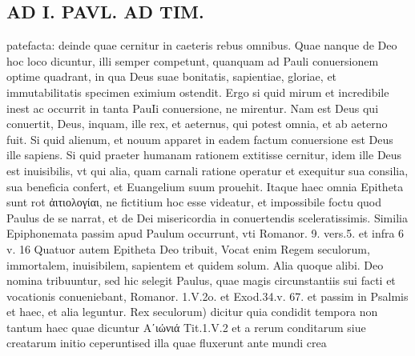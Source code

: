 \documentclass{article}
\begin{document}
\begin{pages}
\section*{AD I. PAVL. AD TIM. }
\marginpar{[ p.30 ]}\pstart patefacta: deinde quae cernitur in caeteris rebus omnibus. Quae nanque de Deo hoc loco dicuntur, illi semper competunt, quanquam ad Pauli conuersionem optime quadrant, in qua Deus suae bonitatis, sapientiae, gloriae, et immutabilitatis specimen eximium ostendit. Ergo si quid mirum et incredibile inest ac occurrit in tanta PauIi conuersione, ne mirentur. Nam est Deus qui conuertit, Deus, inquam, ille rex, et aeternus, qui potest omnia, et ab aeterno fuit. Si quid alienum, et nouum apparet in eadem factum conuersione est Deus ille sapiens. Si quid praeter humanam rationem extitisse cernitur, idem ille Deus est inuisibilis, vt qui alia, quam carnali ratione operatur et exequitur sua consilia, sua beneficia confert, et Euangelium suum prouehit. Itaque haec omnia Epitheta sunt rot ἀιτιολογίαι, ne fictitium hoc esse videatur, et impossibile foctu quod Paulus de se narrat, et de Dei misericordia in conuertendis sceleratissimis. Similia Epiphonemata passim apud Paulum occurrunt, vti Romanor. 9. vers.5. et infra 6 v. 16 Quatuor autem Epitheta Deo tribuit, Vocat enim Regem seculorum, immortalem, inuisibilem, sapientem et quidem solum. Alia quoque alibi. Deo nomina tribuuntur, sed hic selegit Paulus, quae magis circunstantiis sui facti et vocationis conueniebant, Romanor. 1.V.2o. et Exod.34.v. 67. et passim in Psalmis et haec, et alia leguntur. Rex seculorum) dicitur quia condidit tempora non tantum haec quae dicuntur Αʹιώνιά  Tit.1.V.2 et a rerum conditarum siue creatarum initio ceperuntised illa quae fluxerunt ante mundi crea\pend

\end{pages}
\end{document}
